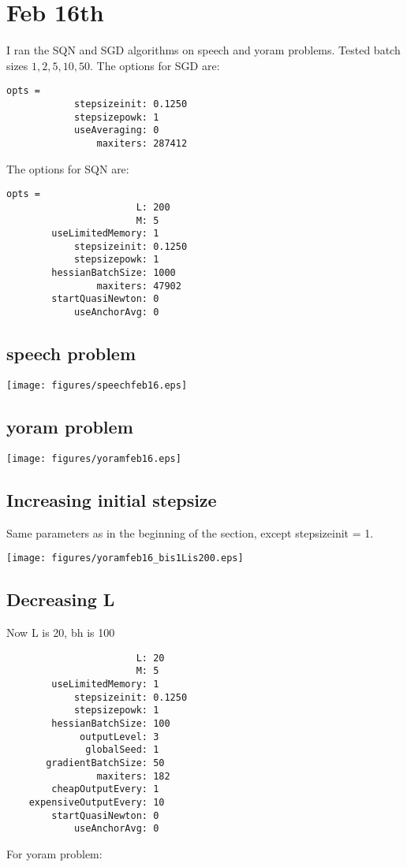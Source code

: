 \documentclass{article}
\begin{document}
\section{Feb 16th}

I ran the SQN and SGD algorithms on speech and yoram problems. 
Tested batch sizes $1,2,5,10,50$. The options for SGD are:
\begin{verbatim}
opts = 
            stepsizeinit: 0.1250
            stepsizepowk: 1
            useAveraging: 0
                maxiters: 287412
\end{verbatim}
The options for SQN are:
\begin{verbatim}
opts = 
                       L: 200
                       M: 5
        useLimitedMemory: 1
            stepsizeinit: 0.1250
            stepsizepowk: 1
        hessianBatchSize: 1000
                maxiters: 47902
        startQuasiNewton: 0
            useAnchorAvg: 0
\end{verbatim}
\subsection{speech problem}
\texttt{[image: figures/speechfeb16.eps]} 
\subsection{yoram problem}
\texttt{[image: figures/yoramfeb16.eps]} 

\subsection{Increasing initial stepsize}
Same parameters as in the beginning of the section, except stepsizeinit = 1.

\texttt{[image: figures/yoramfeb16\_bis1Lis200.eps]} 

\subsection{Decreasing L}
Now L is 20, bh is 100
\begin{verbatim}
                       L: 20
                       M: 5
        useLimitedMemory: 1
            stepsizeinit: 0.1250
            stepsizepowk: 1
        hessianBatchSize: 100
             outputLevel: 3
              globalSeed: 1
       gradientBatchSize: 50
                maxiters: 182
        cheapOutputEvery: 1
    expensiveOutputEvery: 10
        startQuasiNewton: 0
            useAnchorAvg: 0
\end{verbatim}
For yoram problem:
\end{document}
